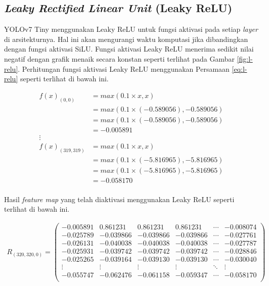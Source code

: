     \subsection{\textit{Leaky Rectified Linear Unit} (Leaky ReLU)}

    YOLOv7 Tiny menggunakan Leaky ReLU untuk fungsi aktivasi pada setiap \textit{layer} di arsitekturnya. Hal ini akan mengurangi waktu komputasi jika dibandingkan dengan fungsi aktivasi SiLU. Fungsi aktivasi Leaky ReLU menerima sedikit nilai negatif dengan grafik menaik secara konstan seperti terlihat pada Gambar \ref{fig:l-relu}. Perhitungan fungsi aktivasi Leaky ReLU menggunakan Persamaan \ref{eq:l-relu} seperti terlihat di bawah ini.

    \begin{align*}
        f(x)_{(0, 0)}       &= max(0.1\times x, x) \\
                            &= max(0.1\times (-0.589056), -0.589056) \\
                            &= max(0.1\times (-0.589056), -0.589056) \\
                            &= -0.005891 \\
        \vdots \\
        f(x)_{(319, 319)}   &= max(0.1\times x, x) \\
                            &= max(0.1\times (-5.816965), -5.816965) \\
                            &= max(0.1\times (-5.816965), -5.816965) \\
                            &= -0.058170 \\
    \end{align*}

    Hasil \textit{feature map} yang telah diaktivasi menggunakan Leaky ReLU seperti terlihat di bawah ini.

    \begin{align*}
        R_{(320, 320, 0)} = 
        \begin{pmatrix}
            -0.005891 & 0.861231  & 0.861231  & 0.861231  & \cdots & -0.008074 \\
            -0.025789 & -0.039866 & -0.039866 & -0.039866 & \cdots & -0.027761 \\
            -0.026131 & -0.040038 & -0.040038 & -0.040038 & \cdots & -0.027787 \\
            -0.025931 & -0.039742 & -0.039742 & -0.039742 & \cdots & -0.028846 \\
            -0.025265 & -0.039164 & -0.039130 & -0.039130 & \cdots & -0.030040 \\
            \vdots    & \vdots    & \vdots    & \vdots    & \ddots & \vdots \\
            -0.055747 & -0.062476 & -0.061158 & -0.059347 & \cdots & -0.058170 \\
        \end{pmatrix}
    \end{align*}

